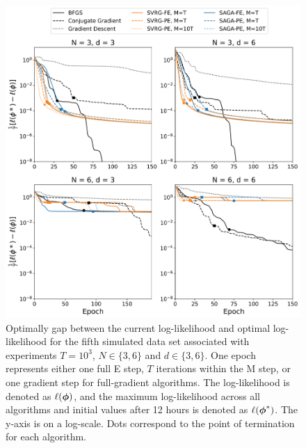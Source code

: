 \documentclass[12pt]{article}
\begin{document}
\begin{figure}[H]
    \centering
    \includegraphics[width=6.5in]{../plt/log-like_v_epoch_T-1000-004.png}
    \caption{Optimally gap between the current log-likelihood and optimal log-likelihood for the fifth simulated data set associated with experiments $T=10^{3}$, $N \in \{3,6\}$ and $d \in \{3,6\}$. One epoch represents either one full E step, $T$ iterations within the M step, or one gradient step for full-gradient algorithms. The log-likelihood is denoted as $\ell(\boldsymbol{\phi})$, and the maximum log-likelihood across all algorithms and initial values after 12 hours is denoted as $\ell(\boldsymbol{\phi}^*)$. The y-axis is on a log-scale. Dots correspond to the point of termination for each algorithm.}
\end{figure}
%
\end{document}
